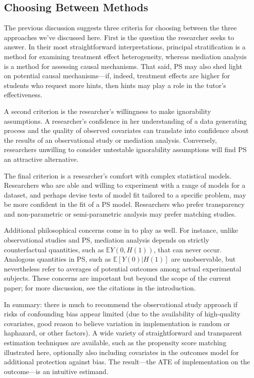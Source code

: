 \documentclass{article}\usepackage[]{graphicx}\usepackage[]{color}
\newcommand{\EE}{\mathbb{E}}
\begin{document}
\subsection{Choosing Between Methods}

The previous discussion suggests three criteria for choosing between
the three approaches we've discussed here.
First is the question the researcher seeks to answer.
In their most straightforward interpretations, principal stratification
is a method for examining treatment effect heterogeneity, whereas
mediation analysis is a method for assessing causal mechanisms.
That said, PS may also shed light on potential causal mechanisms---if,
indeed, treatment effects are higher for students who request more
hints, then hints may play a role in the tutor's effectiveness.

A second criterion is the researcher's willingness to make
ignorability assumptions.
A researcher's confidence in her understanding of a data generating
process and the quality of observed covariates can translate into
confidence about the results of an observational study or mediation
analysis.
Conversely, researchers unwilling to consider untestable ignorability
assumptions will find PS an attractive alternative.

The final criterion is a researcher's comfort with complex statistical
models.
Researchers who are able and willing to experiment with a range of
models for a dataset, and perhaps devise tests of model fit tailored
to a specific problem, may be more confident in the fit of a PS model.
Researchers who prefer transparency and non-parametric or
semi-parametric analysis may prefer matching studies.

Additional philosophical concerns come in to play as well.
For instance, unlike observational studies and PS, mediation analysis
depends on strictly counterfactual quantities, such as $\EE Y(0,H(1))$,
that can never occur.
Analogous quantities in PS, such as $\EE [Y(0)|H(1)]$ are
unobservable, but nevertheless refer to averages of potential outcomes
among actual experimental subjects.
These concerns are important but beyond the scope of the current
paper; for more discussion, see the citations in the introduction.

In summary: there is much to recommend the observational study approach
if risks of confounding bias appear limited
(due to the availability of high-quality covariates, good reason to
believe variation in implementation is random or haphazard, or other
factors).
A wide variety of straightforward and transparent estimation techniques
are available, such as the propensity score
matching illustrated here, optionally also including covariates in the
outcomes model for additional protection against bias.
The result---the ATE of implementation on the outcome---is an
intuitive estimand.
\end{document}
